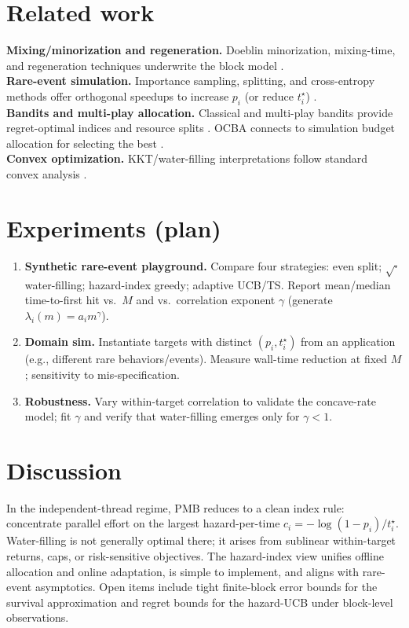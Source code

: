 \documentclass[11pt]{article}
\theoremstyle{definition}
\theoremstyle{remark}
\newcommand{\1}{\mathbbm{1}}
\begin{document}
\section{Related work}
\textbf{Mixing/minorization and regeneration.} Doeblin minorization, mixing-time, and regeneration techniques underwrite the block model \parencite{MeynTweedie2009,LevinPeresWilmer2017}.\\
\textbf{Rare-event simulation.} Importance sampling, splitting, and cross-entropy methods offer orthogonal speedups to increase $p_i$ (or reduce $t_i^\star$) \parencite{AsmussenGlynn2007,RubinsteinKroese2004,RubinoTuffin2009}.\\
\textbf{Bandits and multi-play allocation.} Classical and multi-play bandits provide regret-optimal indices and resource splits \parencite{LaiRobbins1985,Auer2002,Anantharam1987,Kveton2015,KaufmannKordaMunos2012}. OCBA connects to simulation budget allocation for selecting the best \parencite{ChenLee2010,ChenLeePasto2000}.\\
\textbf{Convex optimization.} KKT/water-filling interpretations follow standard convex analysis \parencite{BoydVandenberghe2004}.

\section{Experiments (plan)}
\begin{enumerate}[leftmargin=*, itemsep=2pt]
\item \textbf{Synthetic rare-event playground.} Compare four strategies: even split; $\sqrt{\cdot}$ water-filling; hazard-index greedy; adaptive UCB/TS. Report mean/median time-to-first hit vs.\ $M$ and vs.\ correlation exponent $\gamma$ (generate $\lambda_i(m)=a_i m^\gamma$).
\item \textbf{Domain sim.} Instantiate targets with distinct $(p_i,t_i^\star)$ from an application (e.g., different rare behaviors/events). Measure wall-time reduction at fixed $M$; sensitivity to mis-specification.
\item \textbf{Robustness.} Vary within-target correlation to validate the concave-rate model; fit $\gamma$ and verify that water-filling emerges only for $\gamma<1$.
\end{enumerate}

\section{Discussion}
In the independent-thread regime, PMB reduces to a clean index rule: concentrate parallel effort on the largest hazard-per-time $c_i = -\log(1-p_i)/t_i^\star$. Water-filling is not generally optimal there; it arises from sublinear within-target returns, caps, or risk-sensitive objectives. The hazard-index view unifies offline allocation and online adaptation, is simple to implement, and aligns with rare-event asymptotics. Open items include tight finite-block error bounds for the survival approximation and regret bounds for the hazard-UCB under block-level observations.
\end{document}
